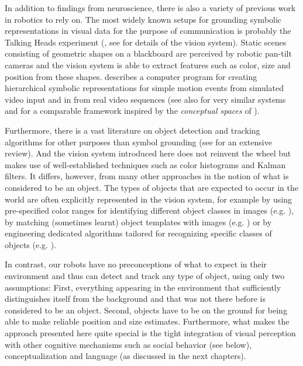 In addition to findings from neuroscience, there is also a variety of
previous work in robotics to rely on. The most widely known setups for
grounding symbolic representations in visual data for the purpose of
communication is probably the Talking Heads experiment
(\citealp{steels98origins}, see \citealp{belpaeme98construction} for
details of the vision system). Static scenes consisting of geometric
shapes on a blackboard are perceived by robotic pan-tilt cameras and
the vision system is able to extract features such as color, size and
position from these shapes. \cite{siskind95grounding} describes a
computer program for creating hierarchical symbolic representations
for simple motion events from simulated video input and in
\citep{siskind01grounding} from real video sequences (see also
\citealp{baillie00action,steels03shared,dominey05learning} for very
similar systems and \citealp{chella00understanding,chella03anchoring}
for a comparable framework inspired by the \emph{conceptual spaces} of
\citealp{gardenfors00conceptual-spaces}).

Furthermore, there is a vast literature on object detection and
tracking algorithms for other purposes than symbol grounding (see
\citealp*{yilmaz06object-tracking} for an extensive review). And the
vision system introduced here does not reinvent the wheel but makes
use of well-established techniques such as color histograms and Kalman
filters. It differs, however, from many other approaches in the notion
of what is considered to be an object. The types of objects that are
expected to occur in the world are often explicitly represented in the
vision system, for example by using pre-specified color ranges for
identifying different object classes in images
(e.g. \citealp{perez02color-based}), by matching (sometimes learnt)
object templates with images (e.g. \citealp{hager98efficient}) or by
engineering dedicated algorithms tailored for recognizing specific
classes of objects (e.g. \citealp*{juengel04real-time}). 

In contrast, our robots have no preconceptions of what to expect in
their environment and thus can detect and track any type of object,
using only two assumptions: First, everything appearing in the
environment that sufficiently distinguishes itself from the background
and that was not there before is considered to be an object. Second,
objects have to be on the ground for being able to make reliable
position and size estimates. Furthermore, what makes the approach
presented here quite special is the tight integration of visual
perception with other cognitive mechanisms such as social behavior
(see below), conceptualization and language (as discussed in the
next chapters).


